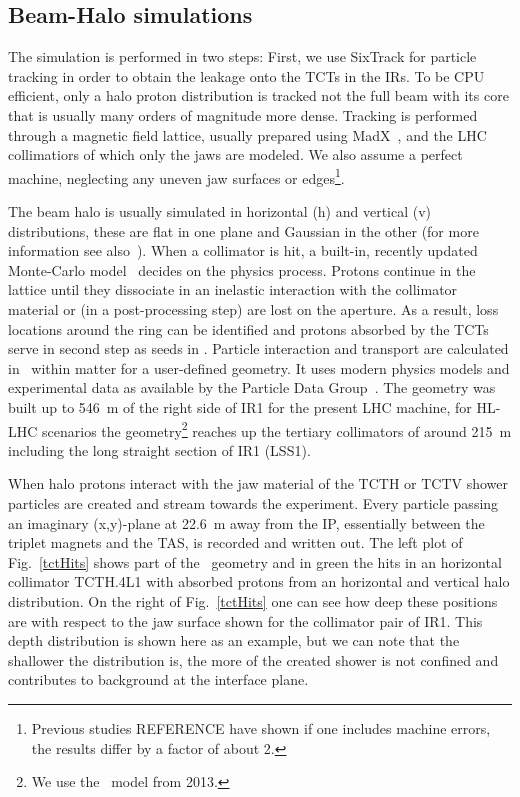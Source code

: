 \subsection{Beam-Halo simulations}
The simulation is performed in two steps: First, we use SixTrack for particle tracking in order to obtain the leakage onto the TCTs in the IRs. To be CPU efficient, only a halo proton distribution is tracked not the full beam with its core that is usually many orders of magnitude more dense. Tracking is performed through a magnetic field lattice, usually prepared using MadX~\cite{madx}, and the LHC collimatiors of which only the jaws are modeled. We also assume a perfect machine, neglecting any uneven jaw surfaces or edges\footnote{Previous studies REFERENCE have shown if one includes machine errors, the results differ by a factor of about 2.}.

The beam halo is usually simulated in horizontal (h) and vertical (v) distributions, these are flat in one plane and Gaussian in the other (for more information see also~\cite{chiarasThesis}). When a collimator is hit, a built-in, recently updated Monte-Carlo model~\cite{claudiasThesis} decides on the physics process. Protons continue in the lattice until they dissociate in an inelastic interaction with the collimator material or (in a post-processing step) are lost on the aperture. As a result, loss locations around the ring can be identified and protons absorbed by the TCTs serve in second step as seeds in \fluka. Particle interaction and transport are calculated in \fluka~within matter for a user-defined geometry. It uses modern physics models and experimental data as available by the Particle Data Group~\cite{pdg}. The geometry was built up to 546~m of the right side of IR1 for the present LHC machine, for HL-LHC scenarios the geometry\footnote{We use the \fluka~model from 2013.} reaches up the tertiary collimators of around 215~m including the long straight section of IR1 (LSS1).

When halo protons interact with the jaw material of the TCTH or TCTV shower particles are created and stream towards the experiment. Every particle passing an imaginary (x,y)-plane at 22.6~m away from the IP, essentially between the triplet magnets and the TAS, is recorded and written out. The left plot of Fig.~\ref{tctHits} shows part of the \fluka~geometry and in green the hits in an horizontal collimator TCTH.4L1 with absorbed protons from an horizontal and vertical halo distribution. On the right of Fig.~\ref{tctHits} one can see how deep these positions are with respect to the jaw surface shown for the collimator pair of IR1. This depth distribution is shown here as an example, but we can note that the shallower the distribution is, the more of the created shower is not confined and contributes to background at the interface plane.

